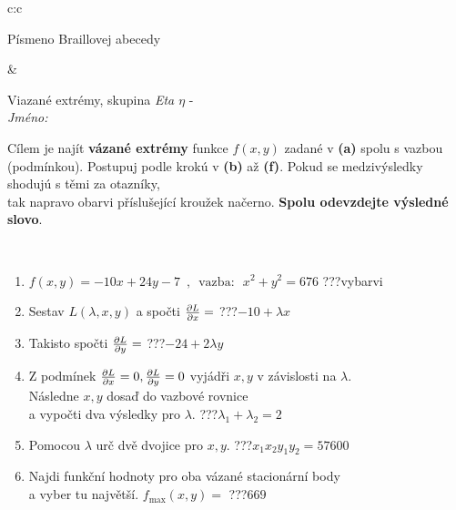 \documentclass[10pt]{report}
\begin{document}
\begin{tabular}{c:c}
\begin{minipage}[c][104.5mm][t]{0.5\linewidth}
\begin{center}
\begin{minipage}{0.20\linewidth}
\begin{center}
{\small Písmeno Braillovej abecedy}
\end{center}
\end{minipage}
\end{center}
\end{minipage}
&
\begin{minipage}[c][104.5mm][t]{0.5\linewidth}
\begin{center}
\vspace{7mm}
{\huge Viazané extrémy, skupina \textit{Eta $\eta$} -}\\[5mm]
\textit{Jméno:}\phantom{xxxxxxxxxxxxxxxxxxxxxxxxxxxxxxxxxxxxxxxxxxxxxxxxxxxxxxxxxxxxxxxxx}\\[5mm]
\begin{minipage}{0.95\linewidth}
\begin{center}
Cílem je najít \textbf{vázané extrémy} funkce $f(x,y)$ zadané v \textbf{(a)} spolu s vazbou (podmínkou). Postupuj podle krokú v \textbf{(b)} až \textbf{(f)}. Pokud se medzivýsledky shodujú s těmi za otazníky,\\tak napravo obarvi příslušející kroužek načerno. \textbf{Spolu odevzdejte výsledné slovo}.
\end{center}
\end{minipage}
\\[1mm]
\begin{minipage}{0.79\linewidth}
\begin{center}
\begin{varwidth}{\linewidth}
\begin{enumerate}
\normalsize
\item $f(x,y)=-10x+24y-7 \enspace , \enspace \mathrm{vazba:} \enspace x^2+y^2=676$\quad \dotfill\; ???\;\dotfill \quad vybarvi
\item Sestav $L(\lambda,x,y)$ a spočti $\pdv{L}{x}=$\quad \dotfill\; ???\;\dotfill \quad $-10+\lambda x$
\item Takisto spočti $\pdv{L}{y}=$\quad \dotfill\; ???\;\dotfill \quad $-24+2\lambda y$
\item Z podmínek $\pdv{L}{x}=0 , \pdv{L}{y}=0$ vyjádři $x,y$ v závislosti na $\lambda$.\\ \phantom{xxxxxx}Následne $x,y$ dosaď do vazbové rovnice\\ \phantom{xxxxxx}a vypočti dva výsledky pro $\lambda$.\quad \dotfill\; ???\;\dotfill \quad $\lambda_1+\lambda_2=2$
\item Pomocou $\lambda$ urč dvě dvojice pro $x,y$.\quad \dotfill\; ???\;\dotfill \quad $x_1 x_2 y_1 y_2=57600$
\item Najdi funkční hodnoty pro oba vázané stacionární body\\ \phantom{xxxxxx}a vyber tu najvětší. $f_{\text{max}}(x,y)=$\quad \dotfill\; ???\;\dotfill \quad $669$

\end{enumerate}
\end{varwidth}
\end{center}
\end{minipage}
\end{center}
\end{minipage}
\end{tabular}
\end{document}

